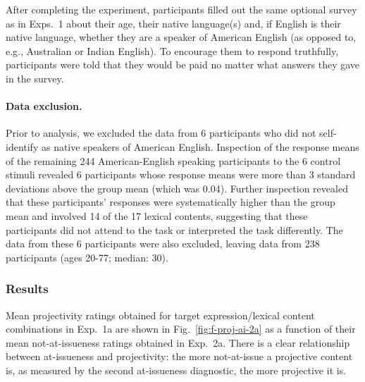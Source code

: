 \documentclass[11pt,fleqn]{article}
\newcommand{\6}{\mbox{$[\hspace*{-.6mm}[$}}
\newcommand{\9}{\mbox{$]\hspace*{-.6mm}]$}}
\newcommand{\figref}[1]{Fig.~\ref{#1}}
\begin{document}
After completing the experiment, participants filled out the same optional survey as in Exps.~1 about their age, their native language(s) and, if English is their native language, whether they are a speaker of American English (as opposed to, e.g., Australian or Indian English). To encourage them to respond truthfully, participants were told that they would be paid no matter what answers they gave in the survey.

\paragraph{Data exclusion.} Prior to analysis, we excluded the data from 6 participants who did not self-identify as native speakers of American English. Inspection of the response means of the remaining 244 American-English speaking participants to the 6 control stimuli revealed 6 participants whose response means were more than 3 standard deviations above the group mean (which was 0.04). Further inspection revealed that these participants' responses were systematically higher than the group mean and involved 14 of the 17 lexical contents, suggesting that these participants did not attend to the task or interpreted the task differently. The data from these 6 participants were also excluded, leaving data from 238 participants (ages 20-77; median: 30).


\subsubsection{Results}

Mean projectivity ratings obtained for target expression/lexical content combinations in Exp.~1a are shown in \figref{fig:f-proj-ai-2a} as a function of their mean not-at-issueness ratings obtained in Exp.~2a. There is a clear relationship between at-issueness and projectivity: the more not-at-issue a projective content is, as measured by the second at-issueness diagnostic, the more projective it is.
\end{document}
